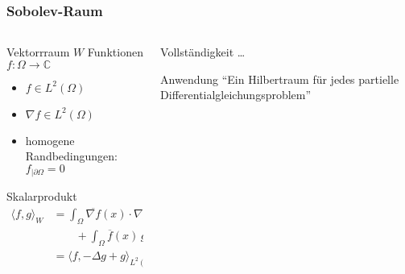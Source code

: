 %
%
%
\bgroup
\begin{frame}[t]
\setlength{\abovedisplayskip}{5pt}
\setlength{\belowdisplayskip}{5pt}
\frametitle{Sobolev-Raum}
\vspace{-20pt}
\begin{columns}[t,onlytextwidth]
\begin{column}{0.48\textwidth}
\begin{block}{Vektorrraum $W$}
Funktionen $f\colon \Omega\to\mathbb{C}$
\begin{itemize}
\item
$f\in L^2(\Omega)$
\item
$\nabla f\in L^2(\Omega)$
\item
homogene Randbedingungen:
$f_{|\partial \Omega}=0$
\end{itemize}
\end{block}
\begin{block}{Skalarprodukt}
\begin{align*}
\langle f,g\rangle_W
&=
\int_\Omega \overline{\nabla f}(x)\cdot\nabla g(x)\,d\mu(x)
\\
&\qquad + \int_{\Omega} \overline{f}(x)\,g(x)\,d\mu(x)
\\
&=\langle f,-\Delta g + g\rangle_{L^2(\Omega)}
\end{align*}
\end{block}
\end{column}
\begin{column}{0.48\textwidth}
\begin{block}{Vollständigkeit}
\dots
\end{block}
\begin{block}{Anwendung}
``Ein Hilbertraum für jedes partielle Differentialgleichungsproblem''
\end{block}
\end{column}
\end{columns}
\end{frame}
\egroup
